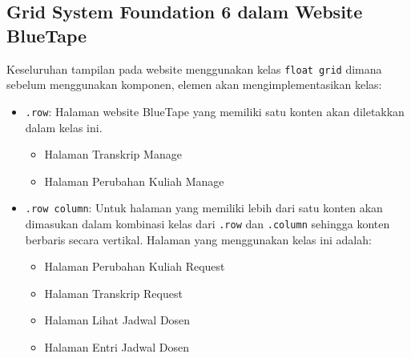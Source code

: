 \subsection{Grid System Foundation 6 dalam Website BlueTape}
Keseluruhan tampilan pada website menggunakan kelas \texttt{float grid} dimana sebelum menggunakan komponen, elemen akan mengimplementasikan kelas:
\begin{itemize}
	\item \texttt{.row}: Halaman website BlueTape yang memiliki satu konten akan diletakkan dalam kelas ini.
	\begin{itemize}
		\item Halaman Transkrip Manage
		\item Halaman Perubahan Kuliah Manage
	\end{itemize}
	\item \texttt{.row column}: Untuk halaman yang memiliki lebih dari satu konten akan dimasukan dalam kombinasi kelas dari \texttt{.row} dan \texttt{.column} sehingga konten berbaris secara vertikal.  Halaman yang menggunakan kelas ini adalah:
	\begin{itemize}
		\item Halaman Perubahan Kuliah Request
		\item Halaman Transkrip Request
		\item Halaman Lihat Jadwal Dosen
		\item Halaman Entri Jadwal Dosen
	\end{itemize}	
	 	 
\end{itemize}

